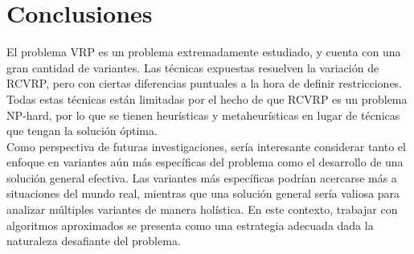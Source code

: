 \documentclass[letter, 10pt]{article}
\begin{document}
\section{Conclusiones}
El problema VRP es un problema extremadamente estudiado, y cuenta con una gran cantidad de variantes. Las técnicas expuestas resuelven la variación de RCVRP, pero con ciertas diferencias puntuales a la hora de definir restricciones. Todas estas técnicas están limitadas por el hecho de que RCVRP es un problema NP-hard, por lo que se tienen heurísticas y metaheurísticas en lugar de técnicas que tengan la solución óptima. \\Como perspectiva de futuras investigaciones, sería interesante considerar tanto el enfoque en variantes aún más específicas del problema como el desarrollo de una solución general efectiva. Las variantes más específicas podrían acercarse más a situaciones del mundo real, mientras que una solución general sería valiosa para analizar múltiples variantes de manera holística. En este contexto, trabajar con algoritmos aproximados se presenta como una estrategia adecuada dada la naturaleza desafiante del problema.
\newpage


\end{document}
